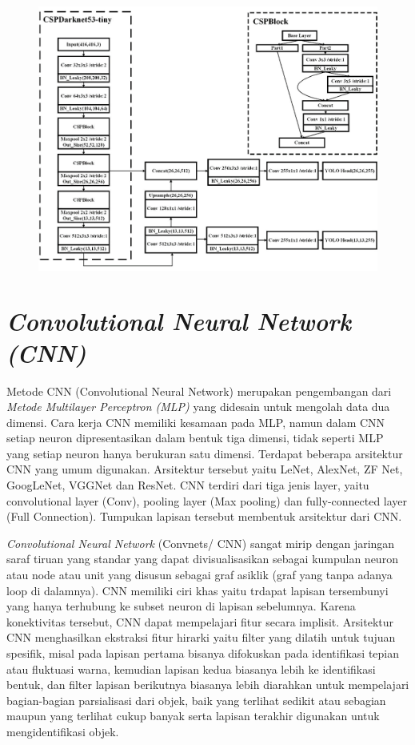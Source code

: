 \begin{figure}
	\begin{center}
		\includegraphics[width=1\textwidth]{gambar/arsitekturyolov4tiny.jpg}
		\citep{jiang2020real}
	\end{center}
\end{figure}
\newpage

\section{\textit{Convolutional Neural Network (CNN)}}
\label{subsec:CNN}
Metode CNN (Convolutional Neural Network) merupakan pengembangan dari \textit{Metode
Multilayer Perceptron (MLP)} yang didesain untuk mengolah data dua dimensi. Cara kerja CNN
memiliki kesamaan pada MLP, namun dalam CNN setiap neuron dipresentasikan dalam
bentuk tiga dimensi, tidak seperti MLP yang setiap neuron hanya berukuran satu dimensi.
Terdapat beberapa arsitektur CNN yang umum digunakan. Arsitektur tersebut yaitu
LeNet, AlexNet, ZF Net, GoogLeNet, VGGNet dan ResNet. CNN terdiri dari tiga jenis layer,
yaitu convolutional layer (Conv), pooling layer (Max pooling) dan fully-connected layer (Full
Connection). Tumpukan lapisan tersebut membentuk arsitektur dari CNN.\citep{DBLP:journals/corr/OSheaN15}

\textit{Convolutional Neural Network} (Convnets/ CNN) sangat mirip
dengan jaringan saraf tiruan yang standar yang dapat divisualisasikan
sebagai kumpulan neuron atau node atau unit yang disusun sebagai
graf asiklik (graf yang tanpa adanya loop di dalamnya). CNN memiliki
ciri khas yaitu trdapat lapisan tersembunyi yang hanya terhubung ke
subset neuron di lapisan sebelumnya. Karena konektivitas tersebut,
CNN dapat mempelajari fitur secara implisit. Arsitektur CNN
menghasilkan ekstraksi fitur hirarki yaitu filter yang dilatih untuk
tujuan spesifik, misal pada lapisan pertama bisanya difokuskan pada
identifikasi tepian atau fluktuasi warna, kemudian lapisan kedua
biasanya lebih ke identifikasi bentuk, dan filter lapisan berikutnya
biasanya lebih diarahkan untuk mempelajari bagian-bagian parsialisasi
dari objek, baik yang terlihat sedikit atau sebagian maupun yang
terlihat cukup banyak serta lapisan terakhir digunakan untuk
mengidentifikasi objek.\citep{bookDL}

